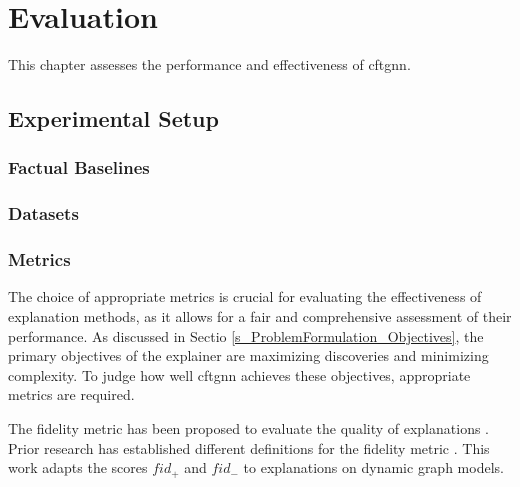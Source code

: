 \section{Evaluation}
\label{s_Evaluation}

This chapter assesses the performance and effectiveness of \gls{cftgnn}.

\subsection{Experimental Setup}
\label{s_Evaluation_Setup}

\subsubsection{Factual Baselines}
\label{s_Evaluation_Setup_FactualBaselines}

\subsubsection{Datasets}
\label{s_Evaluation_Setup_Datasets}

\subsubsection{Metrics} %
\label{s_Evaluation_Setup_Metrics}
The choice of appropriate metrics is crucial for evaluating the effectiveness of explanation methods, as it allows for a fair and comprehensive assessment of their performance. As discussed in Sectio \ref{s_ProblemFormulation_Objectives}, the primary objectives of the explainer are maximizing discoveries and minimizing complexity. To judge how well \gls{cftgnn} achieves these objectives, appropriate metrics are required.

The fidelity metric has been proposed to evaluate the quality of explanations \cite{amara_graphframex_2022}. Prior research has established different definitions for the fidelity metric \cite{yuan_explainability_2020, lucic_cf-gnnexplainer_2022, xia_explaining_2023, amara_graphframex_2022}. This work adapts the scores $fid_+$ and $fid_-$ \cite{amara_graphframex_2022, yuan_explainability_2020} to explanations on dynamic graph models.

